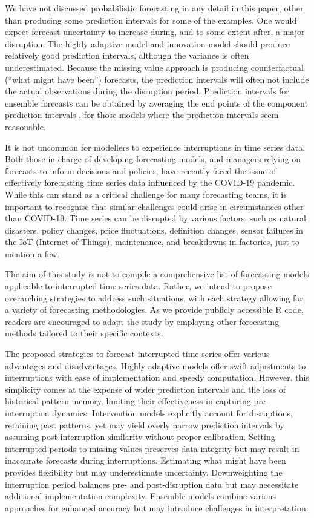 \documentclass[
  11pt,
  a4paper,
]{article}
\begin{document}
We have not discussed probabilistic forecasting in any detail in this
paper, other than producing some prediction intervals for some of the
examples. One would expect forecast uncertainty to increase during, and
to some extent after, a major disruption. The highly adaptive model and
innovation model should produce relatively good prediction intervals,
although the variance is often underestimated. Because the missing value
approach is producing counterfactual (``what might have been'')
forecasts, the prediction intervals will often not include the actual
observations during the disruption period. Prediction intervals for
ensemble forecasts can be obtained by averaging the end points of the
component prediction intervals \autocite{lichtendahl2013better}, for
those models where the prediction intervals seem reasonable.

It is not uncommon for modellers to experience interruptions in time
series data. Both those in charge of developing forecasting models, and
managers relying on forecasts to inform decisions and policies, have
recently faced the issue of effectively forecasting time series data
influenced by the COVID-19 pandemic. While this can stand as a critical
challenge for many forecasting teams, it is important to recognise that
similar challenges could arise in circumstances other than COVID-19.
Time series can be disrupted by various factors, such as natural
disasters, policy changes, price fluctuations, definition changes,
sensor failures in the IoT (Internet of Things), maintenance, and
breakdowns in factories, just to mention a few.

The aim of this study is not to compile a comprehensive list of
forecasting models applicable to interrupted time series data. Rather,
we intend to propose overarching strategies to address such situations,
with each strategy allowing for a variety of forecasting methodologies.
As we provide publicly accessible R code, readers are encouraged to
adapt the study by employing other forecasting methods tailored to their
specific contexts.

The proposed strategies to forecast interrupted time series offer
various advantages and disadvantages. Highly adaptive models offer swift
adjustments to interruptions with ease of implementation and speedy
computation. However, this simplicity comes at the expense of wider
prediction intervals and the loss of historical pattern memory, limiting
their effectiveness in capturing pre-interruption dynamics. Intervention
models explicitly account for disruptions, retaining past patterns, yet
may yield overly narrow prediction intervals by assuming
post-interruption similarity without proper calibration. Setting
interrupted periods to missing values preserves data integrity but may
result in inaccurate forecasts during interruptions. Estimating what
might have been provides flexibility but may underestimate uncertainty.
Downweighting the interruption period balances pre- and post-disruption
data but may necessitate additional implementation complexity. Ensemble
models combine various approaches for enhanced accuracy but may
introduce challenges in interpretation.
\end{document}
